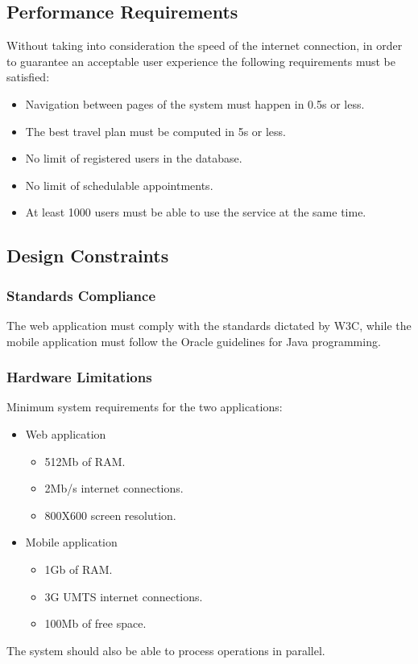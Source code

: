 \clearpage
\subsection{Performance Requirements}
Without taking into consideration the speed of the internet connection, in order to guarantee an acceptable user experience the following  requirements must be satisfied:
\begin{itemize}
\item Navigation between pages of the system must happen in 0.5s or less.
\item The  best travel plan must be computed in 5s or less.
\item No limit of registered users in the database.
\item No limit of schedulable appointments.
\item At least 1000 users must be able to use the service at the same time. 
\end{itemize}
\newpage
\subsection{Design Constraints}
\subsubsection{Standards Compliance}
The web application must comply with the standards dictated by W3C, while the mobile application must follow the Oracle guidelines for Java programming.
\subsubsection{Hardware Limitations}
\label{sec:HardwareLimitations}
Minimum system requirements for the two applications:
\begin{itemize}
\item Web application
\begin{itemize}
\item 512Mb of RAM.
\item 2Mb/s internet connections.
\item 800X600 screen resolution.
\end{itemize}
\item Mobile application
\begin{itemize}
\item 1Gb of RAM.
\item 3G UMTS internet connections.
\item 100Mb of free space.
\end{itemize}
\end{itemize}
The system should also be able to process operations in parallel.
\clearpage
